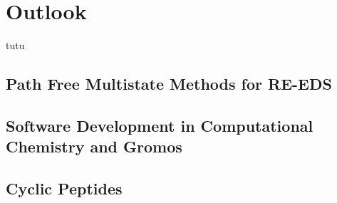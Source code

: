 \chapter{Outlook}
\label{ch:outlook}

{tutu }



\section{Path Free Multistate Methods for RE-EDS}


\section{Software Development in Computational Chemistry and Gromos}


\section{Cyclic Peptides}


%
